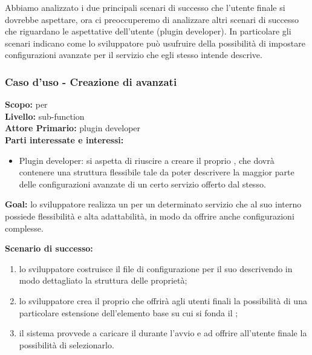 \begin{flushleft}
\begin{boxedminipage}{\textwidth}
\end{boxedminipage}
\end{flushleft}
Abbiamo analizzato i due principali scenari di successo che l'utente finale si dovrebbe aspettare, ora ci preoccuperemo di analizzare altri scenari di successo che riguardano le aspettative dell'utente (plugin developer). In particolare gli scenari indicano come lo sviluppatore può usufruire della possibilità di impostare configurazioni avanzate per il servizio che egli stesso intende descrive.

\begin{flushleft}
\begin{boxedminipage}{\textwidth}

\subsubsection*{Caso d'uso - Creazione di \plugin{} avanzati}

\textbf{Scopo:} \plugin{} per \visualnetkit{} \\
\textbf{Livello:} sub-function \\
\textbf{Attore Primario:} plugin developer \\
\textbf{Parti interessate e interessi:}
\begin{itemize}
\item Plugin developer: si aspetta di riuscire a creare il proprio \plugin{}, che dovrà contenere una struttura flessibile tale da poter descrivere la maggior parte delle configurazioni avanzate di un certo servizio offerto dal \plugin{} stesso.
\end{itemize}

\textbf{Goal:} lo sviluppatore realizza un \plugin{} per un determinato servizio che al suo interno possiede flessibilità e alta adattabilità, in modo da offrire anche configurazioni complesse.

\textbf{Scenario di successo:}
\begin{enumerate}
\item lo sviluppatore costruisce il file di configurazione per il suo \plugin{} descrivendo in modo dettagliato la struttura delle proprietà;
\item lo sviluppatore crea il proprio \plugin{} che offrirà agli utenti finali la possibilità di una particolare estensione dell'elemento base su cui si fonda il \plugin{};
\item il sistema provvede a caricare il \plugin{} durante l'avvio e ad offrire all'utente finale la possibilità di selezionarlo.
\end{enumerate}

\end{boxedminipage}
\end{flushleft}

